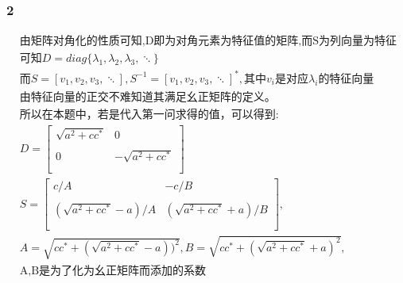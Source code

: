 \documentclass[UTF8,a4paper,10pt]{ctexart}
\begin{document}
  \subsubsection{2}
  \begin{equation}
      \begin{aligned}
          &\text{由矩阵对角化的性质可知,D即为对角元素为特征值的矩阵,而S为列向量为特征向量的矩阵。}\\
          &\text{可知}D=\textit{diag}\{\lambda_{1},\lambda_{2},\lambda_{3},\ddots\}\\
          &\text{而}S=[v_{1},v_{2},v_{3},\ddots],S^{-1}=[v_{1},v_{2},v_{3},\ddots]^{*},\text{其中}v_{i}\text{是对应}\lambda_{i}\text{的特征向量}\\
          &\text{由特征向量的正交不难知道其满足幺正矩阵的定义。}\\
          &\text{所以在本题中，若是代入第一问求得的值，可以得到:}\\
          &D=\left[
                \begin{array}{cc}
                \sqrt{a^2+cc^{*}} & 0\\\\
                0 & -\sqrt{a^2+cc^{*}}\\\\
                \end{array}
          \right]\\
          &S=\left[
                \begin{array}{cc}
                c/A & -c/B\\\\
                (\sqrt{a^2+cc^{*}}-a)/A & (\sqrt{a^2+cc^{*}}+a)/B \\\\
                \end{array}
          \right],\\
          &A=\sqrt{cc^{*}+(\sqrt{a^2+cc^{*}}-a))^2},B=\sqrt{cc^{*}+(\sqrt{a^2+cc^{*}}+a)^2},\\
          &\text{A,B是为了化为幺正矩阵而添加的系数}\\
      \end{aligned}
  \end{equation}
\end{document}
